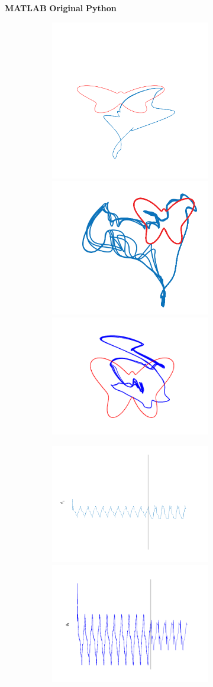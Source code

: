 \begin{figure}

    \centering
    \textbf{MATLAB}\hspace{8em}
    \textbf{Original}\hspace{8em}
    \textbf{Python}
    

    \begin{subfigure}{\textwidth}
        \centering
        
        \textbf{}\begin{subfigure}{\textwidth}
        \centering
        
        
        \hspace{-2em}
        \includegraphics[trim=1.3cm 1.5cm 1.3cm 5.7cm, clip=true, height=.2\linewidth]{Figures/MATLAB/RMHL_T2_Seg2_TimeSeries.png}
        \hspace{-2em}
        \includegraphics[height=.25\linewidth]{Figures/Orig/RMHL_T2_TimeSeries.png}
        \hspace{.25em}
        \includegraphics[trim=2cm 0cm 1.5cm 2cm, clip=true,  height=.2\linewidth]{Figures/Python/RMHL_T2_Seg2_TimeSeries.png} 
        
        \end{subfigure}
         
        
        \textbf{}\begin{subfigure}{\textwidth}
        \centering
        
        \includegraphics[trim=2cm 0cm 0cm 0cm, clip=true,height=0.1\linewidth,width=.45\linewidth]{Figures/MATLAB/RMHL_T2_Seg2_Theta1.png}
        \includegraphics[trim=2cm 0cm 0cm 0cm, clip=true,height=0.1\linewidth,width=.45\linewidth]{Figures/Python/RMHL_T2_Seg2_Theta1.png}
        

\end{subfigure}
\end{subfigure}
\end{figure}
